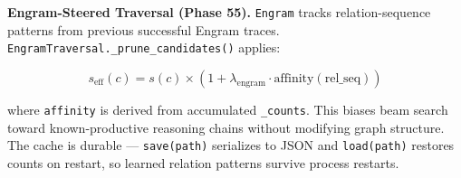 \textbf{Engram-Steered Traversal (Phase 55).} \texttt{Engram} tracks relation-sequence patterns from previous successful Engram traces. \texttt{EngramTraversal.\_prune\_candidates()} applies:

$$s_\text{eff}(c) = s(c) \times (1 + \lambda_\text{engram} \cdot \text{affinity}(\text{rel\_seq}))$$

where \texttt{affinity} is derived from accumulated \texttt{\_counts}. This biases beam search toward known-productive reasoning chains without modifying graph structure. The cache is durable --- \texttt{save(path)} serializes to JSON and \texttt{load(path)} restores counts on restart, so learned relation patterns survive process restarts.
